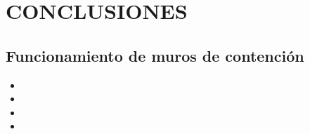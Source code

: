 \chapter{CONCLUSIONES}
\thispagestyle{empty}
\section{Funcionamiento de muros de contención}
\begin{itemize}[leftmargin=1em]
    \item \lipsum[1]
    \item \lipsum[2]
    \item \lipsum[3]
    \item \lipsum[4]
\end{itemize}